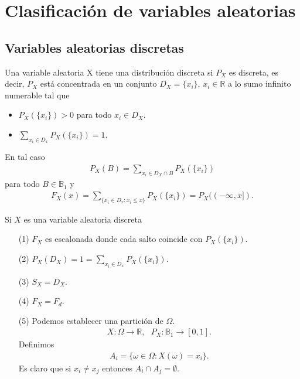 \chapter{Clasificación de variables aleatorias}

\section{Variables aleatorias discretas}
\begin{defi}
Una variable aleatoria X tiene una distribución discreta si $P_X$ es discreta, es decir, $P_X$ está concentrada en un conjunto $D_X = \{x_i\}$, $x_i \in \mathbb{R}$ a lo sumo infinito numerable tal que
\begin{itemize}
    \item $P_X(\{x_i\}) > 0$ para todo $x_i \in D_X$.
    \item $\sum_{x_i \in D_x}{P_X(\{x_i\})} = 1$.
\end{itemize}
En tal caso
\begin{align*}
    P_X(B) = \sum_{x_i \in D_X \cap B}{P_X(\{x_i\})}
\end{align*}
para todo $B \in \mathbb{B}_1$ y
\begin{align*}
    F_X(x) = \sum_{\{x_i \in D_x : x_i \leq x \}}{P_X(\{x_i\})} = P_X((-\infty,x]).
\end{align*}
\end{defi}

\begin{obs}
Si $X$ es una variable aleatoria discreta
\begin{enumerate}
    \item[(1)] $F_X$ es escalonada donde cada salto coincide con $P_X(\{x_i\})$.
    \item[(2)] $P_X(D_X) = 1 = \sum_{x_i \in D_x}{P_X(\{x_i\})}$.
    \item[(3)] $S_X = D_X$.
    \item[(4)] $F_X = F_d$.
    \item[(5)] Podemos establecer una partición de $\Omega$.
    \begin{align*}
        X: \Omega \longrightarrow \mathbb{R}, \ \ \ P_X: \mathbb{B}_1 \longrightarrow [0,1].
    \end{align*}
    Definimos
    \begin{align*}
        A_i = \{ \omega \in \Omega : X(\omega) = x_i \}.
    \end{align*}
    Es claro que si $x_i \not = x_j$ entonces $A_i \cap A_j = \emptyset$.
\end{enumerate}
\end{obs}

